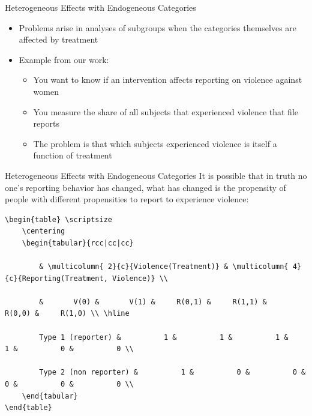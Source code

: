 \documentclass[
  11pt,
  ignorenonframetext,
]{beamer}
\providecommand{\tightlist}{%
  \setlength{\itemsep}{0pt}\setlength{\parskip}{0pt}}\usepackage{longtable,booktabs,array}
\begin{document}
\begin{frame}{Heterogeneous Effects with Endogeneous Categories}
\protect\hypertarget{heterogeneous-effects-with-endogeneous-categories}{}
\begin{itemize}
\item
  Problems arise in analyses of subgroups when the categories themselves
  are affected by treatment
\item
  Example from our work:

  \begin{itemize}
  \tightlist
  \item
    You want to know if an intervention affects reporting on violence
    against women
  \item
    You measure the share of all subjects that experienced violence that
    file reports
  \item
    The problem is that which subjects experienced violence is itself a
    function of treatment
  \end{itemize}
\end{itemize}
\end{frame}

\begin{frame}[fragile]{Heterogeneous Effects with Endogeneous
Categories}
\protect\hypertarget{heterogeneous-effects-with-endogeneous-categories-1}{}
It is possible that in truth no one's reporting behavior has changed,
what has changed is the propensity of people with different propensities
to report to experience violence:

\begin{verbatim}
\begin{table} \scriptsize
    \centering
    \begin{tabular}{rcc|cc|cc}
        
        & \multicolumn{ 2}{c}{Violence(Treatment)} & \multicolumn{ 4}{c}{Reporting(Treatment, Violence)} \\
        
        &       V(0) &       V(1) &     R(0,1) &     R(1,1) &     R(0,0) &     R(1,0) \\ \hline
        
        Type 1 (reporter) &          1 &          1 &          1 &          1 &          0 &          0 \\
        
        Type 2 (non reporter) &          1 &          0 &          0 &          0 &          0 &          0 \\          
    \end{tabular}  
\end{table}
\end{verbatim}
\end{frame}
\end{document}
